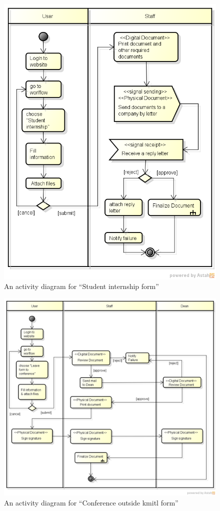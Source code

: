 \begin{figure}
	\centering
	\caption{An activity diagram for \enquote{Student internship form}}
	\label{fig:diagram-student-internship}
	\includegraphics[scale=0.7]{res/Methodology/student_internship}
\end{figure}

\begin{figure}
	\centering
	\caption{An activity diagram for \enquote{Conference outside \gls{kmitl} form}}
	\label{fig:diagram-conference}
	\includegraphics[scale=0.5]{res/Methodology/conference}
\end{figure}

